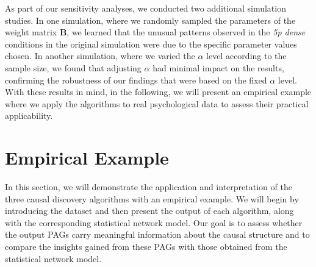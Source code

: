 \documentclass[twoside, 11pt]{article}
\begin{document}
As part of our sensitivity analyses, we conducted two additional simulation studies. In one simulation, where we randomly sampled the parameters of the weight matrix $\mathbf{B}$, we learned that the unusual patterns observed in the \textit{5p dense} conditions in the original simulation were due to the specific parameter values chosen. In another simulation, where we varied the $\alpha$ level according to the sample size, we found that adjusting $\alpha$ had minimal impact on the results, confirming the robustness of our findings that were based on the fixed $\alpha$ level. With these results in mind, in the following, we will present an empirical example where we apply the algorithms to real psychological data to assess their practical applicability.



\newpage
{}
  
\section{Empirical Example} \label{emp-example}
In this section, we will demonstrate the application and interpretation of the three causal discovery algorithms with an empirical example. We will begin by introducing the dataset and then present the output of each algorithm, along with the corresponding statistical network model. Our goal is to assess whether the output PAGs carry meaningful information about the causal structure and to compare the insights gained from these PAGs with those obtained from the statistical network model.
\end{document}
